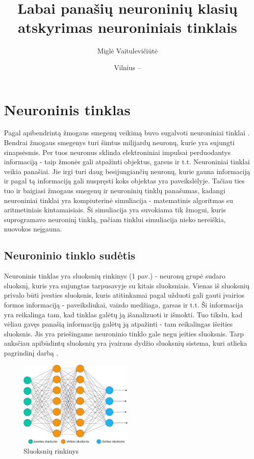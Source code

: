 \documentclass{VUMIFPSkursinis}
\title{Labai panašių neuroninių klasių atskyrimas neuroniniais tinklais}
\author{Miglė Vaitulevičiūtė}
\date{Vilnius – \the\year}
\begin{document}
	
\maketitle
\cleardoublepage{}
\setcounter{page}{2}

\tableofcontents




\section{Neuroninis tinklas}
Pagal apibendrintą žmogaus smegenų veikimą buvo sugalvoti neuroniniai tinklai \cite{Goodfellow-et-al-2016}. Bendrai žmogaus smegenys turi šimtus
milijardų neuronų, kurie yra sujungti sinapsėsmis. Per tuos neuronus sklinda elektroniniai impulsai perduodantys informaciją - taip žmonės gali 
atpažinti objektus, garsus ir t.t. Neuroniniai tinklai veikia panašiai. Jie irgi turi daug besijungiančių neuronų, kurie gauna informaciją ir 
pagal tą informaciją gali nuspręsti koks objektas yra paveikslėlyje. Tačiau ties tuo ir baigiasi žmogaus smegenų ir neuroninių tinklų panašumas, 
kadangi neuroniniai tinklai yra kompiuterinė simuliacija - matematinis algoritmas su aritmetiniais kintamaisiais. Ši simuliacija yra suvokiama 
tik žmogui, kuris suprogramavo neuroninį tinklą, pačiam tinklui simuliacija nieko nereiškia, nuovokos neįgauna.

\subsection{Neuroninio tinklo sudėtis}
Neuroninis tinklas yra sluoksnių rinkinys (1 pav.) - neuronų grupė sudaro sluoksnį, kuris yra sujungtas tarpusavyje su kitais sluoksniais. Vienas iš
sluoksnių privalo būti įvesties sluoksnis, kuris atitinkamai pagal užduoti gali gauti įvairios formos informaciją - paveiksliukai, vaizdo
medžiaga, garsas ir t.t. Ši informacija yra reikalinga tam, kad tinklas galėtų ją išanalizuoti ir išmokti. Tuo tikslu, kad vėliau gavęs panašią
informaciją galėtų ją atpažinti - tam reikalingas išeities sluoksnis. Jis yra priešingame neuroninio tinklo gale negu įeities sluoksnis.
Tarp anksčiau apibūdintų sluoksnių yra įvairaus dydžio sluoksnių sistema, kuri atlieka pagrindinį darbą \cite{Woodford-2018}.

\begin{figure}[h]
\centering
\includegraphics[width=0.5\textwidth]{img/NTSluoksniuSistema.jpeg}
\caption{Sluoksnių rinkinys}
\end{figure}
\end{document}
